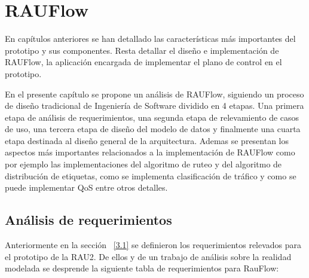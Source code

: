 \chapter{RAUFlow}
\label{Capítulo 5}

\ifpdf
    \graphicspath{{Chapter5/Figs/Raster/}{Chapter5/Figs/PDF/}{Chapter5/Figs/}}
\else
    \graphicspath{{Chapter5/Figs/Vector/}{Chapter5/Figs/}}
\fi

En cap\'itulos anteriores se han detallado las caracter\'isticas m\'as importantes del prototipo y sus componentes. Resta detallar el dise\~no e implementaci\'on de RAUFlow, la aplicaci\'on encargada de implementar el plano de control en el prototipo. 

En el presente cap\'itulo se propone un an\'alisis de RAUFlow, siguiendo un proceso de dise\~no tradicional de Ingenier\'ia de Software dividido en 4 etapas. Una primera etapa de an\'alisis de requerimientos, una segunda etapa de relevamiento de casos de uso, una tercera etapa de dise\~no del modelo de datos y finalmente una cuarta etapa destinada al dise\~no general de la arquitectura. Ademas se presentan los aspectos m\'as importantes relacionados a la implementaci\'on de RAUFlow como por ejemplo las implementaciones del algoritmo de ruteo y del algoritmo de distribución de etiquetas, como se implementa clasificaci\'on de tr\'afico y como se puede implementar QoS entre otros detalles. 

\section[An\'alisi de requerimientos]{An\'alisis de requerimientos}

Anteriormente en la sección ~\ref{3.1} se definieron los requerimientos relevados para el prototipo de la RAU2. De ellos y de un trabajo de an\'alisis sobre la realidad modelada se desprende la siguiente tabla de requerimientos para RauFlow:

